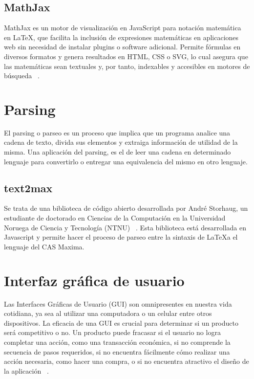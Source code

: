 \subsection{MathJax}
MathJax es un motor de visualización en JavaScript para notación matemática en LaTeX, que facilita la inclusión de expresiones matemáticas en aplicaciones web sin necesidad de instalar plugins o software adicional. Permite fórmulas en diversos formatos y genera resultados en HTML, CSS o SVG, lo cual asegura que las matemáticas sean textuales y, por tanto, indexables y accesibles en motores de búsqueda ~\cite{mathjax}.

\section{Parsing}
El parsing o parseo es un proceso que implica que un programa analice una cadena de texto, divida sus elementos y extraiga información de utilidad de la misma. Una aplicación del parsing, es el de leer una cadena en determinado lenguaje para convertirlo o entregar una equivalencia del mismo en otro lenguaje.

\subsection{text2max}
Se trata de una biblioteca de código abierto desarrollada por André Storhaug, un estudiante de doctorado en Ciencias de la Computación en la Universidad Noruega de Ciencia y Tecnología (NTNU) ~\cite{Parser-tex2maxima}. Esta biblioteca está desarrollada en Javascript y permite hacer el proceso de parseo entre la sintaxis de \LaTeX a el lenguaje del CAS Maxima.

\section{Interfaz gráfica de usuario}
Las Interfaces Gráficas de Usuario (GUI) son omnipresentes en nuestra vida cotidiana, ya sea al utilizar una computadora o un celular entre otros dispositivos. La eficacia de una GUI es crucial para determinar si un producto será competitivo o no. Un producto puede fracasar si el usuario no logra completar una acción, como una transacción económica, si no comprende la secuencia de pasos requeridos, si no encuentra fácilmente cómo realizar una acción necesaria, como hacer una compra, o si no encuentra atractivo el diseño de la aplicación ~\cite{interfazAlbornoz}.
